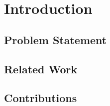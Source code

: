 \chapter{Introduction}



\section{Problem Statement}



\section{Related Work}



\section{Contributions}

